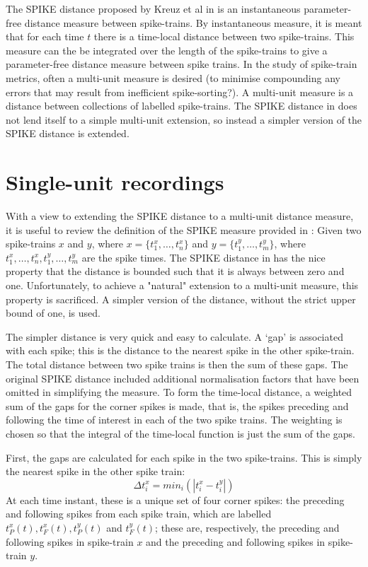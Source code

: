 The SPIKE distance proposed by Kreuz et al in \cite{Kreuzetal2010} is an instantaneous parameter-free distance measure between spike-trains.  By instantaneous measure, it is meant that for each time $t$ there is a time-local distance between two spike-trains.  This measure can the be integrated over the length of the spike-trains to give a parameter-free distance measure between spike trains. In the study of spike-train metrics, often a multi-unit measure is desired (to minimise compounding any errors that may result from inefficient spike-sorting?). A multi-unit measure is a distance between collections of labelled spike-trains.  The SPIKE distance in \cite{Kreuzetal2010} does not lend itself to a simple multi-unit extension, so instead a simpler version of the SPIKE distance is extended.

\section{Single-unit recordings}
With a view to extending the SPIKE distance to a multi-unit distance measure, it is useful to review the definition of the SPIKE measure provided in \cite{Kreuzetal2010}:  Given two spike-trains $x$ and $y$, where $x = \{ t_1^x, \ldots, t_n^x \}$ and $y = \{ t_1^y, \ldots , t_m^y\}$, where $t_1^x,\ldots,t_n^x,t_1^y,\ldots,t_m^y$ are the spike times.  The SPIKE distance in \cite{Kreuzetal2010} has the nice property that the distance is bounded such that it is always between zero and one.  Unfortunately, to achieve a "natural" extension to a multi-unit measure, this property is sacrificed.  A simpler version of the distance, without the strict upper bound of one, is used.

The simpler distance is very quick and easy to calculate.  A `gap' is associated with each spike; this is the distance to the nearest spike in the other spike-train.  The total distance between two spike trains is then the sum of these gaps.  The original SPIKE distance included additional normalisation factors that have been omitted in simplifying the measure.  To form the time-local distance, a weighted sum of the gaps for the corner spikes is made, that is, the spikes preceding and following the time of interest in each of the two spike trains.  The weighting is chosen so that the integral of the time-local function is just the sum of the gaps.

First, the gaps are calculated for each spike in the two spike-trains.  This is simply the nearest spike in the other spike train:
\begin{equation}
\Delta t_i^x = min_i ( | t_i^x - t_i^y |)
\end{equation}
At each time instant, these is a unique set of four corner spikes: the preceding and following spikes from each spike train, which are labelled $t_P^x(t), t_F^x(t), t_P^y(t)$ and  $t_F^y(t)$; these are, respectively, the preceding and following spikes in spike-train $x$ and the preceding and following spikes in spike-train $y$.

